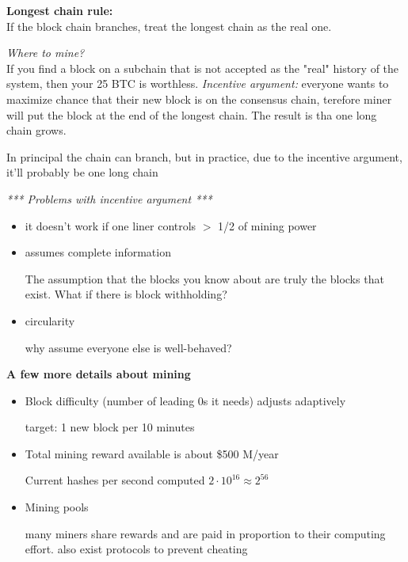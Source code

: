 \textbf{Longest chain rule: }\\
If the block chain branches, treat the longest chain as the real one.

\textit{Where to mine?}\\
If you find a block on a subchain that is not accepted as the "real" history of the system, then your 25 BTC is worthless.
\textit{Incentive argument:} everyone wants to maximize chance that their new block is on the consensus chain, terefore miner will put the block at the end of the longest chain. The result is tha one long chain grows.

In principal the chain can branch, but in practice, due to the incentive argument, it'll probably be one long chain

\textit{*** Problems with incentive argument ***}
\begin{itemize}
	\item it doesn't work if one liner controls $>$ 1/2 of mining power
	\item assumes complete information
	
	The assumption that the blocks you know about are truly the blocks that exist. What if there is block withholding?
	\item circularity
	
	why assume everyone else is well-behaved?
\end{itemize}

\textbf{A few more details about mining}
\begin{itemize}
	\item Block difficulty (number of leading 0s it needs) adjusts adaptively
	
	target: 1 new block per 10 minutes
	\item Total mining reward available is about \$500 M/year
	
	Current hashes per second computed
	$2 \cdot 10^{16} \approx 2^{56}$
	\item Mining pools
	
	many miners share rewards and are paid in proportion to their computing effort. also exist protocols to prevent cheating
\end{itemize}



